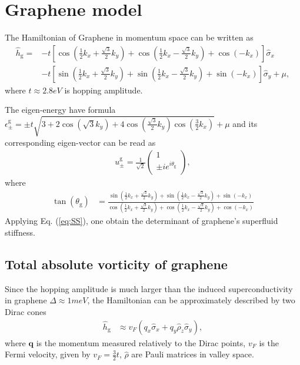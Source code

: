 \documentclass{article}
\begin{document}
\section{Graphene model}
The Hamiltonian of Graphene in momentum space can be written as 
\begin{align}
    \hat{h}_{\textrm{g}} = &-t \left[\cos(\frac{1}{2}k_x + \frac{\sqrt{3}}{2} k_y )+ \cos(\frac{1}{2}k_x - \frac{\sqrt{3}}{2} k_{y}  )+ \cos(-k_x)\right] \hat{\sigma}_x \nonumber\\
    &-t \left[\sin(\frac{1}{2}k_x + \frac{\sqrt{3}}{2} k_y )+ \sin(\frac{1}{2}k_x - \frac{\sqrt{3}}{2} k_y )+ \sin(-k_x)\right] \hat{\sigma}_y+\mu,
\end{align}
where $ t \approx 2.8eV $ is hopping amplitude. 

The eigen-energy have formula $ \epsilon^{\textrm{g}}_\pm = \pm t \sqrt{3+2 \cos(\sqrt{3} k_y )+4 \cos(\frac{\sqrt{3}}{2}k_y ) \cos(\frac{3}{2}k_x)} + \mu  $ and its corresponding eigen-vector can be read as 
\begin{align}
    u^{\textrm{g}}_\pm = \frac{1}{\sqrt{2} } \left(\begin{array}{c}
         1 \\
         \pm i e^{i \theta_{\textrm{g}} } \\
    \end{array}\right),
\end{align}
where
\begin{align}
    \tan(\theta_{\textrm{g}} ) &= \frac{\sin(\frac{1}{2}k_x + \frac{\sqrt{3}}{2} k_y )+ \sin(\frac{1}{2}k_x - \frac{\sqrt{3}}{2} k_y )+ \sin(-k_x)}{\cos(\frac{1}{2}k_x + \frac{\sqrt{3}}{2} k_y )+ \cos(\frac{1}{2}k_x - \frac{\sqrt{3}}{2} k_{y}  )+ \cos(-k_x)} 
\end{align}
Applying Eq. (\ref{eq:SS}), one obtain the determinant of graphene's superfluid stiffness. 

\subsection{Total absolute vorticity of graphene}
Since the hopping amplitude is much larger than the induced superconductivity in graphene $ \Delta \approx 1meV $, the Hamiltonian can be approximately described by two Dirac cones 
\begin{align}
    \hat{h}_{\textrm{g}} &\approx   v_{F} \left( q_x \hat{\sigma}_x + q_y \hat{\rho}_z \hat{\sigma}_y \right),
\end{align}
where $ \mathbf{q} $ is the momentum measured relatively to the Dirac points, $ v_F $ is the Fermi velocity, given by $ v_F = \frac{3}{2} t $, $ \hat{\rho} $ are Pauli matrices in valley space. 
\end{document}
